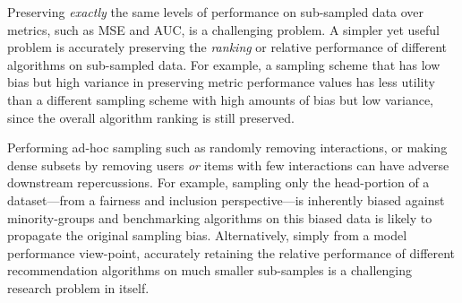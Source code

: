 Preserving \emph{exactly} the same levels of performance on sub-sampled data over metrics, such as MSE and AUC, is a challenging problem. A simpler yet useful problem is accurately preserving the \emph{ranking} or relative performance of different algorithms on sub-sampled data. For example, a sampling scheme that has low bias but high variance in preserving metric performance values has less utility than a different sampling scheme with high amounts of bias but low variance, since the overall algorithm ranking is still preserved. 

Performing 
ad-hoc sampling such as randomly removing interactions, or making dense subsets by removing users \emph{or} items with few interactions \cite{sigir20} can have adverse downstream repercussions. For example, sampling only the head-portion of a dataset---from a fairness and inclusion perspective---is inherently biased against minority-groups and benchmarking algorithms on this biased data is 
likely to propagate the 
original sampling bias.
Alternatively,
simply from 
a model performance view-point,
accurately retaining the relative performance of different recommendation algorithms on much smaller sub-samples is a challenging research problem in itself.

